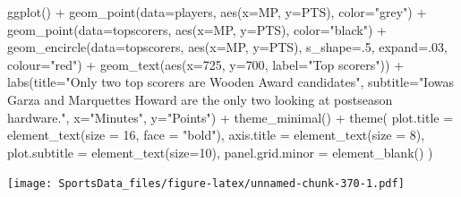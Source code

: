 \documentclass[
]{book}
\newenvironment{Shaded}{\begin{snugshade}}{\end{snugshade}}
\newcommand{\AttributeTok}[1]{\textcolor[rgb]{0.77,0.63,0.00}{#1}}
\newcommand{\DecValTok}[1]{\textcolor[rgb]{0.00,0.00,0.81}{#1}}
\newcommand{\FunctionTok}[1]{\textcolor[rgb]{0.00,0.00,0.00}{#1}}
\newcommand{\NormalTok}[1]{#1}
\newcommand{\SpecialCharTok}[1]{\textcolor[rgb]{0.00,0.00,0.00}{#1}}
\newcommand{\StringTok}[1]{\textcolor[rgb]{0.31,0.60,0.02}{#1}}
\begin{document}
\begin{Shaded}
\begin{Highlighting}[]
\FunctionTok{ggplot}\NormalTok{() }\SpecialCharTok{+} 
  \FunctionTok{geom\_point}\NormalTok{(}\AttributeTok{data=}\NormalTok{players, }\FunctionTok{aes}\NormalTok{(}\AttributeTok{x=}\NormalTok{MP, }\AttributeTok{y=}\NormalTok{PTS), }\AttributeTok{color=}\StringTok{"grey"}\NormalTok{) }\SpecialCharTok{+} 
  \FunctionTok{geom\_point}\NormalTok{(}\AttributeTok{data=}\NormalTok{topscorers, }\FunctionTok{aes}\NormalTok{(}\AttributeTok{x=}\NormalTok{MP, }\AttributeTok{y=}\NormalTok{PTS), }\AttributeTok{color=}\StringTok{"black"}\NormalTok{) }\SpecialCharTok{+} 
  \FunctionTok{geom\_encircle}\NormalTok{(}\AttributeTok{data=}\NormalTok{topscorers, }\FunctionTok{aes}\NormalTok{(}\AttributeTok{x=}\NormalTok{MP, }\AttributeTok{y=}\NormalTok{PTS), }\AttributeTok{s\_shape=}\NormalTok{.}\DecValTok{5}\NormalTok{, }\AttributeTok{expand=}\NormalTok{.}\DecValTok{03}\NormalTok{, }\AttributeTok{colour=}\StringTok{"red"}\NormalTok{) }\SpecialCharTok{+}
  \FunctionTok{geom\_text}\NormalTok{(}\FunctionTok{aes}\NormalTok{(}\AttributeTok{x=}\DecValTok{725}\NormalTok{, }\AttributeTok{y=}\DecValTok{700}\NormalTok{, }\AttributeTok{label=}\StringTok{"Top scorers"}\NormalTok{)) }\SpecialCharTok{+} 
  \FunctionTok{labs}\NormalTok{(}\AttributeTok{title=}\StringTok{"Only two top scorers are Wooden Award candidates"}\NormalTok{, }\AttributeTok{subtitle=}\StringTok{"Iowa\textquotesingle{}s Garza and Marquette\textquotesingle{}s Howard are the only two looking at postseason hardware."}\NormalTok{, }\AttributeTok{x=}\StringTok{"Minutes"}\NormalTok{, }\AttributeTok{y=}\StringTok{"Points"}\NormalTok{) }\SpecialCharTok{+} 
  \FunctionTok{theme\_minimal}\NormalTok{() }\SpecialCharTok{+} 
  \FunctionTok{theme}\NormalTok{(}
    \AttributeTok{plot.title =} \FunctionTok{element\_text}\NormalTok{(}\AttributeTok{size =} \DecValTok{16}\NormalTok{, }\AttributeTok{face =} \StringTok{"bold"}\NormalTok{),}
    \AttributeTok{axis.title =} \FunctionTok{element\_text}\NormalTok{(}\AttributeTok{size =} \DecValTok{8}\NormalTok{), }
    \AttributeTok{plot.subtitle =} \FunctionTok{element\_text}\NormalTok{(}\AttributeTok{size=}\DecValTok{10}\NormalTok{), }
    \AttributeTok{panel.grid.minor =} \FunctionTok{element\_blank}\NormalTok{()}
\NormalTok{    )}
\end{Highlighting}
\end{Shaded}

\texttt{[image: SportsData\_files/figure-latex/unnamed-chunk-370-1.pdf]}
\end{document}
